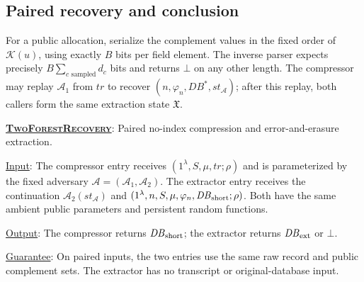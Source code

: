 \documentclass[11pt]{article}
\newenvironment{fminipage}%
  {\begin{Sbox}\begin{minipage}}%
  {\end{minipage}\end{Sbox}\fbox{\TheSbox}}
\newenvironment{algbox}[0]{%
\vskip 0.2in
\noindent
\begin{fminipage}{6.3in}
}{%
\end{fminipage}
\vskip 0.2in
}
\begin{document}
\subsection{Paired recovery and conclusion}

For a public allocation, serialize the complement values in the fixed order of
$\mathcal K(u)$, using exactly $B$ bits per field element.  The inverse parser
expects precisely $B\sum_{c\text{ sampled}}d_c$ bits and returns $\bot$ on any
other length.  The compressor may replay $\mathcal A_1$ from $\mathit{tr}$ to
recover $(n,\varphi_n,\mathit{DB}^{*},\mathit{st}_{\mathcal A})$; after this
replay, both callers form the same extraction state $\mathfrak X$.

\begin{algbox}
\textbf{\uline{\textsc{TwoForestRecovery}}}: Paired no-index compression and
error-and-erasure extraction.
\label{alg:recovery}

\uline{Input}: The compressor entry receives
$(1^\lambda,S,\mu,\mathit{tr};\rho)$ and is parameterized by the fixed
adversary $\mathcal A=(\mathcal A_1,\mathcal A_2)$.  The extractor entry
receives the continuation $\mathcal A_2(\mathit{st}_{\mathcal A})$ and
$(1^\lambda,n,S,\mu,\varphi_n,\mathit{DB}_{\rm short};\rho)$.  Both have the
same ambient public parameters and persistent random functions.

\uline{Output}: The compressor returns $\mathit{DB}_{\rm short}$; the extractor
returns $\mathit{DB}_{\rm ext}$ or $\bot$.

\uline{Guarantee}: On paired inputs, the two entries use the same raw record and
public complement sets.  The extractor has no transcript or original-database
input.


\end{algbox}
\end{document}
